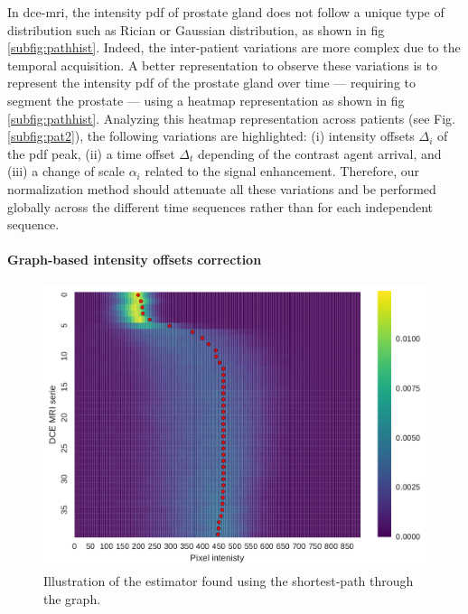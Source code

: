 In \ac{dce}-\ac{mri}, the intensity \ac{pdf} of prostate gland does not follow a unique type of distribution such as Rician or Gaussian distribution, as shown in \acs{fig}\,\ref{subfig:pathhist}.
Indeed, the inter-patient variations are more complex due to the temporal acquisition.
A better representation to observe these variations is to represent the intensity \ac{pdf} of the prostate gland over time --- requiring to segment the prostate --- using a heatmap representation as shown in \acs{fig}\,\ref{subfig:pathhist}.
Analyzing this heatmap representation across patients (see Fig.\,\ref{subfig:pat2}), the following variations are highlighted:
(i) intensity offsets $\Delta_i$ of the \ac{pdf} peak,
(ii) a time offset $\Delta_t$ depending of the contrast agent arrival, and
(iii) a change of scale $\alpha_i$ related to the signal enhancement.
Therefore, our normalization method should attenuate all these variations and be performed globally across the different time sequences rather than for each independent sequence.

\paragraph{Graph-based intensity offsets correction}\label{par:chp5:DCE-norm:graph}

\begin{figure}
  \centering
  \includegraphics[width=0.7\linewidth]{5_normalization/figures/DCE-normalization/estimator.pdf}
  \caption{Illustration of the estimator found using the shortest-path through the graph.}
  \label{fig:estimator}
\end{figure}

